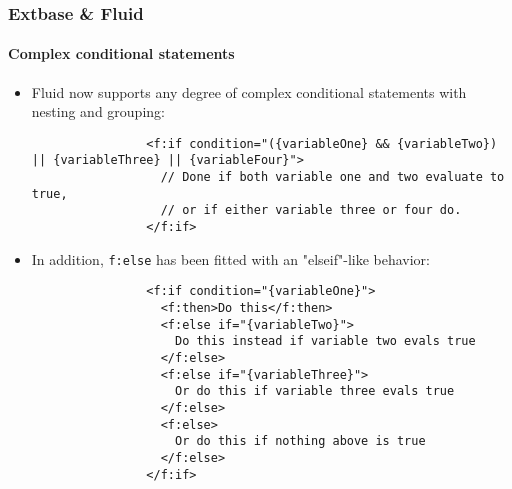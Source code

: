 \begin{frame}[fragile]
	\frametitle{Extbase \& Fluid}
	\framesubtitle{Complex conditional statements}

	\lstset{basicstyle=\tiny\ttfamily}

	\begin{itemize}

		\item Fluid now supports any degree of complex conditional statements with
			nesting and grouping:

			\begin{lstlisting}
				<f:if condition="({variableOne} && {variableTwo}) || {variableThree} || {variableFour}">
				  // Done if both variable one and two evaluate to true,
				  // or if either variable three or four do.
				</f:if>
			\end{lstlisting}

		\item In addition, \texttt{f:else} has been fitted with an "elseif"-like behavior:

			\begin{lstlisting}
				<f:if condition="{variableOne}">
				  <f:then>Do this</f:then>
				  <f:else if="{variableTwo}">
				    Do this instead if variable two evals true
				  </f:else>
				  <f:else if="{variableThree}">
				    Or do this if variable three evals true
				  </f:else>
				  <f:else>
				    Or do this if nothing above is true
				  </f:else>
				</f:if>
			\end{lstlisting}

	\end{itemize}

\end{frame}


